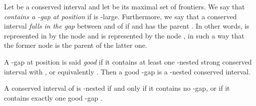 \documentclass{article}
\begin{document}
 Let  be a conserved interval and let  be its maximal set of frontiers. We say that  {\em contains a
 -\emph{gap} at position } if  is -large.
 Furthermore, we say that a conserved interval  {\em falls in the
 gap} between  and  of  if  and
  has the parent . In other
 words,  is represented in  by the node 
 and  is  represented by the node ,
 in such a way that the former node is the parent of the latter one.
 

A -gap at position  is said \emph{good} if it contains at least one
-nested strong conserved interval  with ,
or equivalently . Then a good -gap is
a -nested conserved interval.


\begin{theorem}\label{thgap}
A conserved interval  of  is -nested if and only if it contains no
-gap, or if it contains exactly one good -gap .
\end{theorem}
\end{document}

